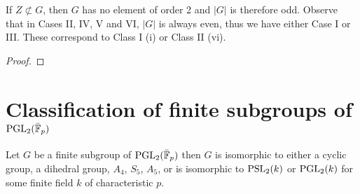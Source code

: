 \begin{lemma} 
    If $Z \not \subset G$, then $G$ has no element of order 2 and $|G|$ is therefore odd. Observe that in Cases II, IV, V and VI, $|G|$ is always even, thus we have either Case I or III. These correspond to Class I (i) or Class II (vi). \\
\end{lemma}
\begin{proof}

\end{proof}

\section{Classification of finite subgroups of $\operatorname{PGL}_2(\bar{\mathbb{F}}_p)$}

\begin{theorem}
    \label{FLT_classification_fin_subgroups_of_PGL2_over_AlgClosure_ZMod}
    \leanok
    Let $G$ be a finite subgroup of $\operatorname{PGL}_2(\bar{\mathbb{F}}_p)$ then $G$ is isomorphic to either a cyclic group, a dihedral group, $A_4$, $S_5$, $A_5$, or is isomorphic to $\operatorname{PSL}_2(k)$ or $\operatorname{PGL}_2(k)$ for some finite field $k$ of characteristic $p$.
\end{theorem}


